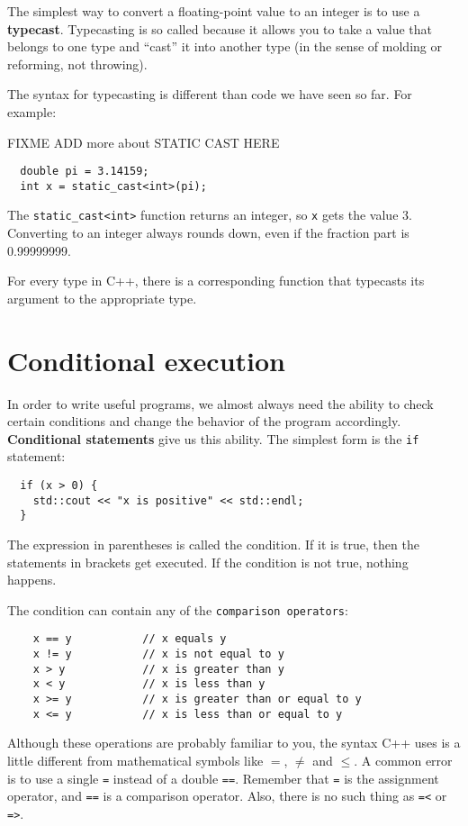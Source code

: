 The simplest way to convert a floating-point value to an integer is to
use a {\bf typecast}.  Typecasting is so called because it allows you
to take a value that belongs to one type and ``cast'' it into another
type (in the sense of molding or reforming, not throwing).

The syntax for typecasting is different than code we have seen so far.  For example:

FIXME ADD more about STATIC CAST HERE
\begin{lstlisting}
  double pi = 3.14159;
  int x = static_cast<int>(pi);
\end{lstlisting}
%
The {\tt static\_cast<int>} function returns an integer, so {\tt x} gets the value
3.  Converting to an integer always rounds down, even if the fraction
part is 0.99999999.

For every type in C++, there is a corresponding function that
typecasts its argument to the appropriate type.

\section{Conditional execution}

In order to write useful programs, we almost always need the ability
to check certain conditions and change the behavior of the program
accordingly.  {\bf Conditional statements} give us this ability.  The
simplest form is the {\tt if} statement:

\begin{lstlisting}
  if (x > 0) {
    std::cout << "x is positive" << std::endl;
  }
\end{lstlisting}
%
The expression in parentheses is called the condition.
If it is true, then the statements in brackets get executed.
If the condition is not true, nothing happens.


The condition can contain any of the {\tt comparison operators}:

\begin{lstlisting}
    x == y           // x equals y
    x != y           // x is not equal to y
    x > y            // x is greater than y
    x < y            // x is less than y
    x >= y           // x is greater than or equal to y
    x <= y           // x is less than or equal to y
\end{lstlisting}
%
Although these operations are probably familiar to you, the
syntax C++ uses is a little different from mathematical
symbols like $=$, $\neq$ and $\le$.  A common error is
to use a single {\tt =} instead of a double {\tt ==}.  Remember
that {\tt =} is the assignment operator, and {\tt ==} is
a comparison operator.  Also, there is no such thing as
{\tt =<} or {\tt =>}.


